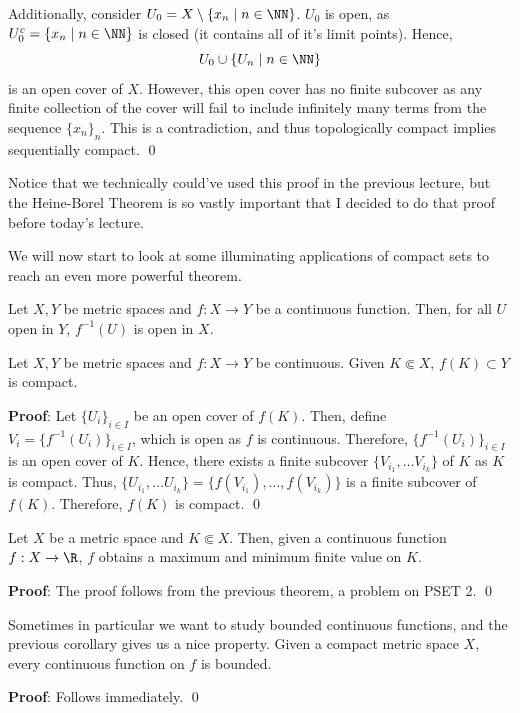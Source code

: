 Additionally, consider $U_0 = X\setminus \{x_n\mid n\in \NN\}$. $U_0$ is open, as $U_0^c = \{x_n \mid n\in \NN\}$ is closed (it contains all of it's limit points). Hence,
\[
U_0 \cup \{U_n\mid n\in \NN\}
\]
is an open cover of $X$. However, this open cover has no finite subcover as any finite collection of the cover will fail to include infinitely many terms from the sequence $\{x_n\}_n$. This is a contradiction, and thus topologically compact implies sequentially compact. \qed 

\begin{remark}
Notice that we technically could've used this proof in the previous lecture, but the Heine-Borel Theorem is so vastly important that I decided to do that proof before today's lecture.
\end{remark}

We will now start to look at some illuminating applications of compact sets to reach an even more powerful theorem.

\begin{recall}
Let $X,Y$ be metric spaces and $f:X\to Y$ be a continuous function. Then, for all $U$ open in $Y$, $f^{-1}(U)$ is open in $X$.
\end{recall}

\begin{theorem}
Let $X,Y$ be metric spaces and $f:X\to Y$ be continuous. Given $K\Subset X$, $f(K) \subset Y$ is compact.
\end{theorem}
\textbf{Proof}: Let $\{U_i\}_{i\in I}$ be an open cover of $f(K)$. Then, define $V_i = \{f^{-1}(U_i)\}_{i\in I}$, which is open as $f$ is continuous. Therefore, $\{f^{-1}(U_i)\}_{i\in I}$ is an open cover of $K$. Hence, there exists a finite subcover $\{V_{i_1}, \dots V_{i_k}\}$ of $K$ as $K$ is compact. Thus, $\{U_{i_1},\dots U_{i_k}\} = \{f(V_{i_1}), \dots, f(V_{i_k})\}$ is a finite subcover of $f(K)$. Therefore, $f(K)$ is compact. \qed 
\begin{corollary}
Let $X$ be a metric space and $K\Subset X$. Then, given a continuous function $f:X\to \R$, $f$ obtains a maximum and minimum finite value on $K$.
\end{corollary}
\textbf{Proof}: The proof follows from the previous theorem, a problem on PSET 2. \qed 

\begin{corollary}
Sometimes in particular we want to study bounded continuous functions, and the previous corollary gives us a nice property. Given a compact metric space $X$, every continuous function on $f$ is bounded.
\end{corollary}
\textbf{Proof}: Follows immediately. \qed 

